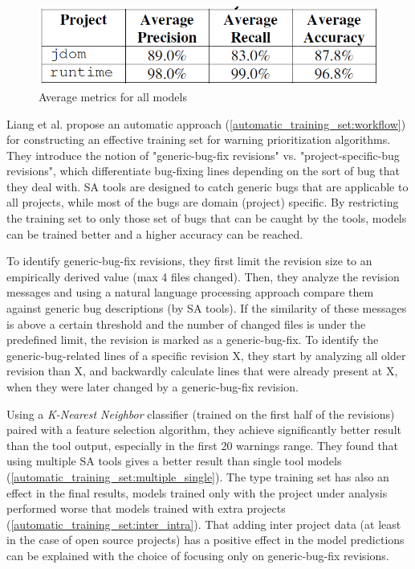 \documentclass{article}
\begin{document}
 \begin{figure}[H]
     \centering
     \includegraphics[scale=0.3]{./src/model_building_results.png}
     \caption{Average metrics for all models}\label{model_building:results}
 \end{figure}


 Liang et al. \cite{automatic_training_set} propose an automatic approach (\cref{automatic_training_set:workflow}) for constructing an effective training set for warning prioritization algorithms. They introduce the notion of "generic-bug-fix revisions" vs. "project-specific-bug revisions", which differentiate bug-fixing lines depending on the sort of bug that they deal with. SA tools are designed to catch generic bugs that are applicable to all projects, while most of the bugs are domain (project) specific. By restricting the training set to only those set of bugs that can be caught by the tools, models can be trained better and a higher accuracy can be reached.

 To identify generic-bug-fix revisions, they first limit the revision size to an empirically derived value (max 4 files changed). Then, they analyze the revision messages and using a natural language processing approach compare them against generic bug descriptions (by SA tools). If the similarity of these messages is above a certain threshold and the number of changed files is under the predefined limit, the revision is marked as a generic-bug-fix. To identify the generic-bug-related lines of a specific revision X, they start by analyzing all older revision than X, and backwardly calculate lines that were already present at X, when they were later changed by a generic-bug-fix revision.

 Using a \textit{K-Nearest Neighbor} classifier (trained on the first half of the revisions) paired with a feature selection algorithm, they achieve significantly better result than the tool output, especially in the first 20 warnings range. They found that using multiple SA tools gives a better result than single tool models (\cref{automatic_training_set:multiple_single}). The type training set has also an effect in the final results, models trained only with the project under analysis performed worse that models trained with extra projects (\cref{automatic_training_set:inter_intra}). That adding inter project data (at least in the case of open source projects) has a positive effect in the model predictions can be explained with the choice of focusing only on generic-bug-fix revisions.
\end{document}
